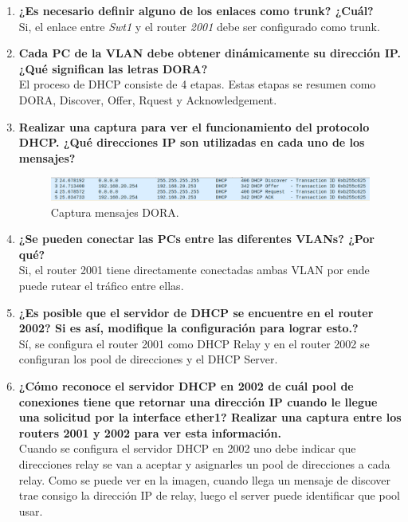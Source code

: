 \documentclass[letterpaper,12pt]{article}
\begin{document}
\begin{enumerate}
    \item \textbf{¿Es necesario definir alguno de los enlaces como trunk? ¿Cuál?} \\
    Si, el enlace entre \textit{Swt1} y el router \textit{2001} debe ser configurado como trunk.
    
    \item \textbf{Cada PC de la VLAN debe obtener dinámicamente su dirección IP. ¿Qué significan las letras DORA?} \\
    El proceso de DHCP consiste de 4 etapas. Estas etapas se resumen como DORA, Discover, Offer, Rquest y Acknowledgement. 

    \item \textbf{Realizar una captura para ver el funcionamiento del protocolo DHCP. ¿Qué direcciones IP son utilizadas en cada uno de los mensajes?}
    \begin{figure}[ht] 
        
        \centering \includegraphics[width=0.8\columnwidth]{lab12.PNG}
        \caption{
                \label{fig:samplesetup} 
                Captura mensajes DORA.
        }
    \end{figure}

    \item \textbf{¿Se pueden conectar las PCs entre las diferentes VLANs? ¿Por qué?} \\
    Si, el router 2001 tiene directamente conectadas ambas VLAN por ende puede rutear el tráfico entre ellas. 
    
    \item \textbf{¿Es posible que el servidor de DHCP se encuentre en el router 2002? Si es así, modifique la configuración para lograr esto.?} \\
    Sí, se configura el router 2001 como DHCP Relay y en el router 2002 se configuran los pool de direcciones y el DHCP Server.
    
    \item \textbf{¿Cómo reconoce el servidor DHCP en 2002 de cuál pool de conexiones tiene que retornar una dirección IP cuando le llegue una solicitud por la interface ether1? Realizar una captura entre los routers 2001 y 2002 para ver esta información.} \\
    Cuando se configura el servidor DHCP en 2002 uno debe indicar que direcciones relay se van a aceptar y asignarles un pool de direcciones a cada relay. Como se puede ver en la imagen, cuando llega un mensaje de discover trae consigo la dirección IP de relay, luego el server puede identificar que pool usar.
    

\end{enumerate}
\end{document}
